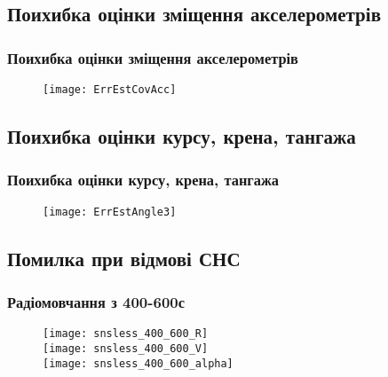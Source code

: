 \documentclass[ucs,compress]{beamer}    %
\begin{document}
\subsection{Поихибка оцінки зміщення акселерометрів} 
\begin{frame}%
\frametitle{Поихибка оцінки зміщення акселерометрів}
\begin{figure}
\centering
\texttt{[image: ErrEstCovAcc]}
\end{figure}
\end{frame}
\subsection{Поихибка оцінки курсу, крена, тангажа} 
\begin{frame}%
\frametitle{Поихибка оцінки курсу, крена, тангажа}
\begin{figure}
\centering
\texttt{[image: ErrEstAngle3]}
\end{figure}
\end{frame}

\subsection{Помилка при відмові СНС} 
\begin{frame}%
\frametitle{Радіомовчання з 400-600с}
\begin{figure}
\texttt{[image: snsless\_400\_600\_R]}\\
\texttt{[image: snsless\_400\_600\_V]}\\
\texttt{[image: snsless\_400\_600\_alpha]}\\
\end{figure}
\end{frame}
\end{document}
